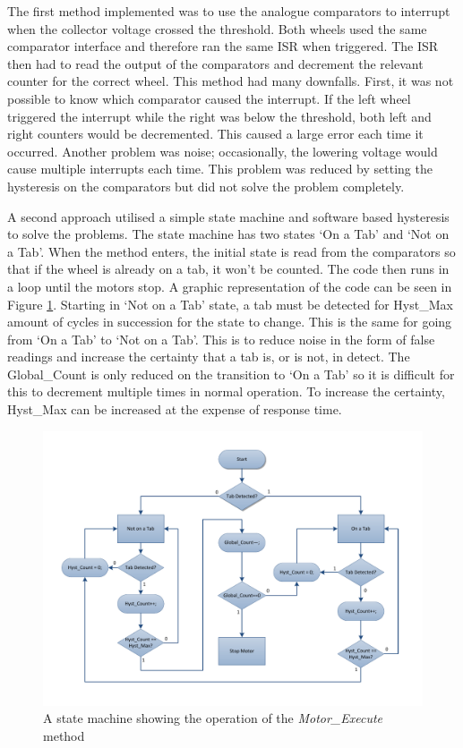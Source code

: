 The first method implemented was to use the analogue comparators to interrupt when the collector voltage crossed the threshold. Both wheels used the same comparator interface and therefore ran the same ISR when triggered. The ISR then had to read the output of the comparators and decrement the relevant counter for the correct wheel. This method had many downfalls. First, it was not possible to know which comparator caused the interrupt. If the left wheel triggered the interrupt while the right was below the threshold, both left and right counters would be decremented. This caused a large error each time it occurred. Another problem was noise; occasionally, the lowering voltage would cause multiple interrupts each time. This problem was reduced by setting the hysteresis on the comparators but did not solve the problem completely. 

A second approach utilised a simple state machine and software based hysteresis to solve the problems. The state machine has two states `On a Tab' and `Not on a Tab'. When the method enters, the initial state is read from the comparators so that if the wheel is already on a tab, it won't be counted. The code then runs in a loop until the motors stop. A graphic representation of the code can be seen in Figure \ref{fig:StateMachine}. Starting in `Not on a Tab' state, a tab must be detected for Hyst\_Max amount of cycles in succession for the state to change. This is the same for going from `On a Tab' to `Not on a Tab'. This is to reduce noise in the form of false readings and increase the certainty that a tab is, or is not, in detect. The Global\_Count is only reduced on the transition to `On a Tab' so it is difficult for this to decrement multiple times in normal operation. To increase the certainty, Hyst\_Max can be increased at the expense of response time. 


\begin{figure}
\includegraphics[width=\textwidth]{Figures/ASM.pdf}
\caption{A state machine showing the operation of the \textit{Motor\_Execute} method}
\label{fig:StateMachine}
\end{figure}


